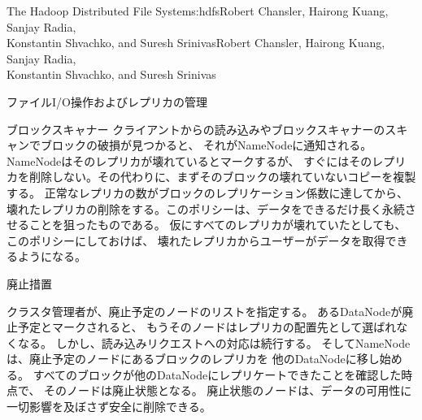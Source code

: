 \begin{aosachaptertoc}{The Hadoop Distributed File System}{s:hdfs}{Robert Chansler, Hairong Kuang, Sanjay Radia, \\ Konstantin Shvachko, and Suresh Srinivas}{Robert Chansler, Hairong Kuang, Sanjay Radia, \\ \hspace*{0.9cm} Konstantin Shvachko, and Suresh Srinivas}
\begin{aosasect1}{ファイルI/O操作およびレプリカの管理}
\begin{aosasect2}{ブロックスキャナー}
クライアントからの読み込みやブロックスキャナーのスキャンでブロックの破損が見つかると、
それがNameNodeに通知される。NameNodeはそのレプリカが壊れているとマークするが、
すぐにはそのレプリカを削除しない。その代わりに、まずそのブロックの壊れていないコピーを複製する。
正常なレプリカの数がブロックのレプリケーション係数に達してから、
壊れたレプリカの削除をする。このポリシーは、データをできるだけ長く永続させることを狙ったものである。
仮にすべてのレプリカが壊れていたとしても、
このポリシーにしておけば、
壊れたレプリカからユーザーがデータを取得できるようになる。

\end{aosasect2}

\begin{aosasect2}{廃止措置}

クラスタ管理者が、廃止予定のノードのリストを指定する。
あるDataNodeが廃止予定とマークされると、
もうそのノードはレプリカの配置先として選ばれなくなる。
しかし、読み込みリクエストへの対応は続行する。
そしてNameNodeは、廃止予定のノードにあるブロックのレプリカを
他のDataNodeに移し始める。
すべてのブロックが他のDataNodeにレプリケートできたことを確認した時点で、
そのノードは廃止状態となる。
廃止状態のノードは、データの可用性に一切影響を及ぼさず安全に削除できる。

\end{aosasect2}


\end{aosasect1}
\end{aosachaptertoc}
